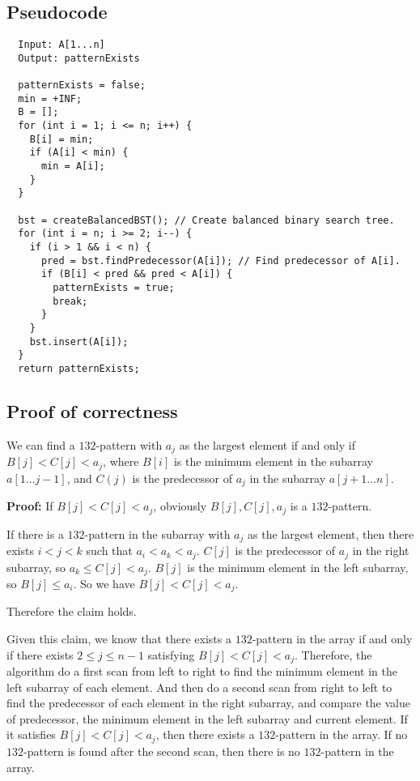 \documentclass[paper=a4, fontsize=11pt]{scrartcl} %
\numberwithin{equation}{section} %
\numberwithin{figure}{section} %
\numberwithin{table}{section} %
\newcounter{claimcounter}
\numberwithin{claimcounter}{section}
\newenvironment{claim}{\stepcounter{claimcounter}{\textbf{Claim \theclaimcounter:}}}{}
\begin{document}
\subsection*{Pseudocode}
\begin{verbatim}
  Input: A[1...n]
  Output: patternExists
  
  patternExists = false;
  min = +INF;
  B = [];
  for (int i = 1; i <= n; i++) {
    B[i] = min;
    if (A[i] < min) {
      min = A[i];
    }
  }
  
  bst = createBalancedBST(); // Create balanced binary search tree.
  for (int i = n; i >= 2; i--) {
    if (i > 1 && i < n) {
      pred = bst.findPredecessor(A[i]); // Find predecessor of A[i].
      if (B[i] < pred && pred < A[i]) {
        patternExists = true;
        break;
      }
    }
    bst.insert(A[i]);
  }
  return patternExists;
\end{verbatim}

\subsection*{Proof of correctness}
\begin{claim}
  We can find a $132$-pattern with $a_j$ as the largest element if and only if
  $B[j] < C[j] < a_j$, where $B[i]$ is the minimum element in the subarray
  $a[1\dots j-1]$, and $C(j)$ is the predecessor of $a_j$ in the subarray
  $a[j+1\dots n]$.
\end{claim}

\textbf{Proof:}
If $B[j] < C[j] < a_j$, obviously $B[j], C[j], a_j$ is a $132$-pattern.

If there is a $132$-pattern in the subarray with $a_j$ as the largest element,
then there exists $i < j < k$ such that $a_i < a_k < a_j$. $C[j]$ is the 
predecessor of $a_j$ in the right subarray, so $a_k \leq C[j] < a_j$.
$B[j]$ is the minimum element in the left subarray, so $B[j] \leq a_i$.
So we have $B[j] < C[j] < a_j$.

Therefore the claim holds.
\vspace{0.5cm}

Given this claim, we know that there exists a $132$-pattern in the array
if and only if there exists $2 \leq j \leq n-1$ satisfying $B[j] < C[j] < a_j$.
Therefore, the algorithm do a first scan from left to right to find the minimum 
element in the left subarray of each element. And then do a second scan from 
right to left to find the predecessor of each element in the right subarray, and
compare the value of predecessor, the minimum element in the left subarray and
current element. If it satisfies $B[j] < C[j] < a_j$, then there exists a 
$132$-pattern in the array. If no $132$-pattern is found after the second scan,
then there is no $132$-pattern in the array.
\end{document}
